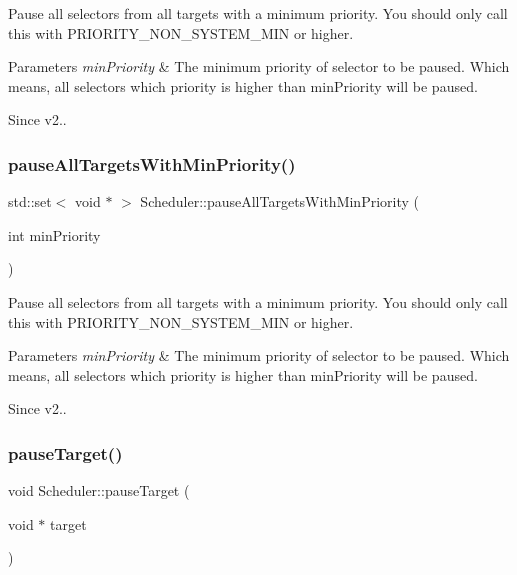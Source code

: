 Pause all selectors from all targets with a minimum priority. You should only call this with P\+R\+I\+O\+R\+I\+T\+Y\+\_\+\+N\+O\+N\+\_\+\+S\+Y\+S\+T\+E\+M\+\_\+\+M\+IN or higher. 
\begin{DoxyParams}{Parameters}
{\em min\+Priority} & The minimum priority of selector to be paused. Which means, all selectors which priority is higher than min\+Priority will be paused. \\
\hline
\end{DoxyParams}
\begin{DoxySince}{Since}
v2.. 
\end{DoxySince}
\mbox{\label{classScheduler_ac981921d200acdeedffa17c5e0c06f77}} 
\subsubsection{\texorpdfstring{pause\+All\+Targets\+With\+Min\+Priority()}{pauseAllTargetsWithMinPriority()}\hspace{0.1cm}{\footnotesize\ttfamily [2/2]}}
{\footnotesize\ttfamily std\+::set$<$ void $\ast$ $>$ Scheduler\+::pause\+All\+Targets\+With\+Min\+Priority (\begin{DoxyParamCaption}\item[{int}]{min\+Priority }\end{DoxyParamCaption})}

Pause all selectors from all targets with a minimum priority. You should only call this with P\+R\+I\+O\+R\+I\+T\+Y\+\_\+\+N\+O\+N\+\_\+\+S\+Y\+S\+T\+E\+M\+\_\+\+M\+IN or higher. 
\begin{DoxyParams}{Parameters}
{\em min\+Priority} & The minimum priority of selector to be paused. Which means, all selectors which priority is higher than min\+Priority will be paused. \\
\hline
\end{DoxyParams}
\begin{DoxySince}{Since}
v2.. 
\end{DoxySince}
\mbox{\label{classScheduler_a409cb6f82cffd7d779154d9d813664af}} 
\subsubsection{\texorpdfstring{pause\+Target()}{pauseTarget()}\hspace{0.1cm}{\footnotesize\ttfamily [1/2]}}
{\footnotesize\ttfamily void Scheduler\+::pause\+Target (\begin{DoxyParamCaption}\item[{void $\ast$}]{target }\end{DoxyParamCaption})}

